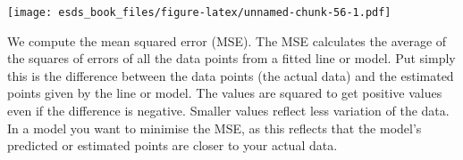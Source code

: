 \documentclass[
]{book}
\newenvironment{Shaded}{\begin{snugshade}}{\end{snugshade}}
\newcommand{\CommentTok}[1]{\textcolor[rgb]{0.56,0.35,0.01}{\textit{#1}}}
\newcommand{\DataTypeTok}[1]{\textcolor[rgb]{0.13,0.29,0.53}{#1}}
\newcommand{\DecValTok}[1]{\textcolor[rgb]{0.00,0.00,0.81}{#1}}
\newcommand{\FloatTok}[1]{\textcolor[rgb]{0.00,0.00,0.81}{#1}}
\newcommand{\KeywordTok}[1]{\textcolor[rgb]{0.13,0.29,0.53}{\textbf{#1}}}
\newcommand{\NormalTok}[1]{#1}
\newcommand{\OperatorTok}[1]{\textcolor[rgb]{0.81,0.36,0.00}{\textbf{#1}}}
\newcommand{\OtherTok}[1]{\textcolor[rgb]{0.56,0.35,0.01}{#1}}
\newcommand{\StringTok}[1]{\textcolor[rgb]{0.31,0.60,0.02}{#1}}
\begin{document}
\begin{Shaded}
\end{Shaded}

\texttt{[image: esds\_book\_files/figure-latex/unnamed-chunk-56-1.pdf]}

We compute the mean squared error (MSE). The MSE calculates the average of the squares of errors of all the data points from a fitted line or model. Put simply this is the difference between the data points (the actual data) and the estimated points given by the line or model. The values are squared to get positive values even if the difference is negative. Smaller values reflect less variation of the data. In a model you want to minimise the MSE, as this reflects that the model's predicted or estimated points are closer to your actual data.

\begin{Shaded}
\end{Shaded}
\end{document}

